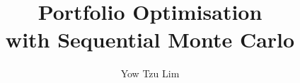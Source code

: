 \documentclass[a4paper,12pt,twoside]{report}
\begin{document}
\title{\LARGE {\bf Portfolio Optimisation\\with Sequential Monte Carlo}\\
 \vspace*{6mm}
}

\author{Yow Tzu Lim}

\mediumlinespacing

\maketitle

\preface



%
%

\body
\mediumlinespacing







\appendix




\end{document}

